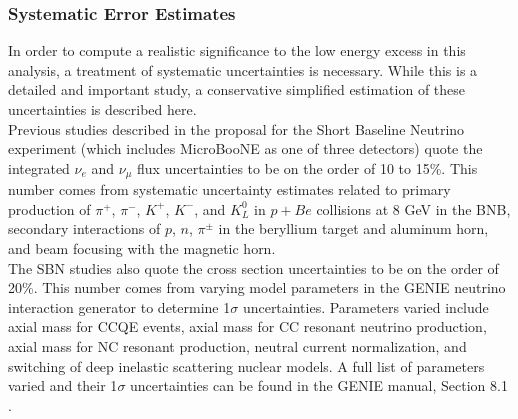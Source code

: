 \subsubsection{Systematic Error Estimates}

In order to compute a realistic significance to the low energy excess in this analysis, a treatment of systematic uncertainties is necessary. While this is a detailed and important study, a conservative simplified estimation of these uncertainties is described here.\\

Previous studies described in the proposal for the Short Baseline Neutrino experiment (which includes MicroBooNE as one of three detectors) \cite{SBNproposal} quote the integrated $\nu_e$ and $\nu_\mu$ flux uncertainties to be on the order of 10 to 15\%. This number comes from systematic uncertainty estimates related to primary production of $\pi^+$, $\pi^-$, $K^+$, $K^-$, and $K^0_L$ in $p+Be$ collisions at 8 GeV in the BNB, secondary interactions of $p$, $n$, $\pi^\pm$ in the beryllium target and aluminum horn, and beam focusing with the magnetic horn.\\

The SBN studies also quote the cross section uncertainties to be on the order of 20\%. This number comes from varying model parameters in the GENIE neutrino interaction generator to determine 1$\sigma$ uncertainties. Parameters varied include axial mass for CCQE events, axial mass for CC resonant neutrino production, axial mass for NC resonant production, neutral current normalization, and switching of deep inelastic scattering nuclear models. A full list of parameters varied and their 1$\sigma$ uncertainties can be found in the GENIE manual, Section 8.1 \cite{GENIEsource}.\\

